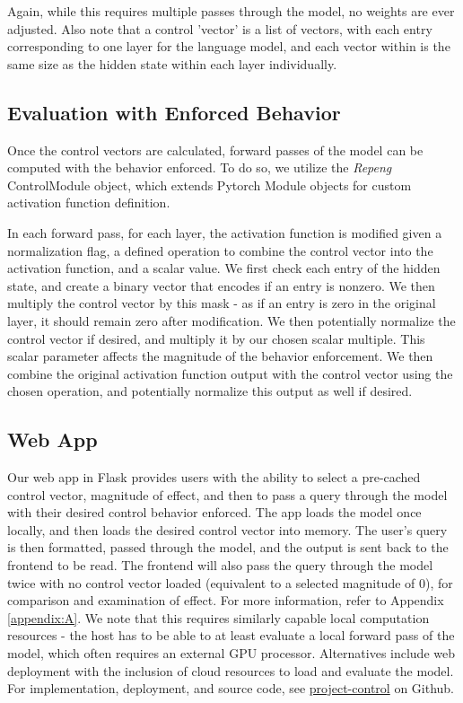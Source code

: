 \documentclass[11pt,a4paper]{article}
\begin{document}
Again, while this requires multiple passes through the model, no weights are ever adjusted. Also note that a control 'vector' is a list of vectors, with each entry corresponding to one layer for the language model, and each vector within is the same size as the hidden state within each layer individually.

\subsection{Evaluation with Enforced Behavior}
Once the control vectors are calculated, forward passes of the model can be computed with the behavior enforced. To do so, we utilize the \emph{Repeng} ControlModule object, which extends Pytorch Module objects for custom activation function definition. 

In each forward pass, for each layer, the activation function is modified given a normalization flag, a defined operation to combine the control vector into the activation function, and a scalar value. We first check each entry of the hidden state, and create a binary vector that encodes if an entry is nonzero. We then multiply the control vector by this mask - as if an entry is zero in the original layer, it should remain zero after modification. We then potentially normalize the control vector if desired, and multiply it by our chosen scalar multiple. This scalar parameter affects the magnitude of the behavior enforcement. We then combine the original activation function output with the control vector using the chosen operation, and potentially normalize this output as well if desired.


\subsection{Web App}
Our web app in Flask provides users with the ability to select a pre-cached control vector, magnitude of effect, and then to pass a query through the model with their desired control behavior enforced. The app loads the model once locally, and then loads the desired control vector into memory. The user's query is then formatted, passed through the model, and the output is sent back to the frontend to be read. The frontend will also pass the query through the model twice with no control vector loaded (equivalent to a selected magnitude of 0), for comparison and examination of effect. For more information, refer to Appendix \ref{appendix:A}. We note that this requires similarly capable local computation resources - the host has to be able to at least evaluate a local forward pass of the model, which often requires an external GPU processor. Alternatives include web deployment with the inclusion of cloud resources to load and evaluate the model. For implementation, deployment, and source code, see \href{https://github.com/tulane-cmps6730/project-control}{project-control} on Github.
\end{document}
